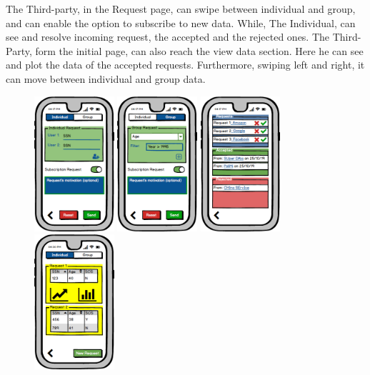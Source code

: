 \documentclass[a4paper]{article}
\begin{document}
The Third-party, in the Request page, can swipe between individual and group, and can enable the option to subscribe to new data. While, The Individual, can see and resolve incoming request, the accepted and the rejected ones. The Third- Party, form the initial page, can also reach the view data section. Here he can see and plot the data of the accepted requests. Furthermore, swiping left and right, it can move between individual and group data.
\begin{figure}[!htpb]		
		
     	\centering		
     	\includegraphics[height=50mm]{images/mockups/Requests.png}		
     	\includegraphics[height=50mm]{images/mockups/GroupRequest.png}		
     	\includegraphics[height=50mm]{images/mockups/ManageRequests.png}		
     	\includegraphics[height=50mm]{images/mockups/ViewData.png}		

\end{figure}
\end{document}
